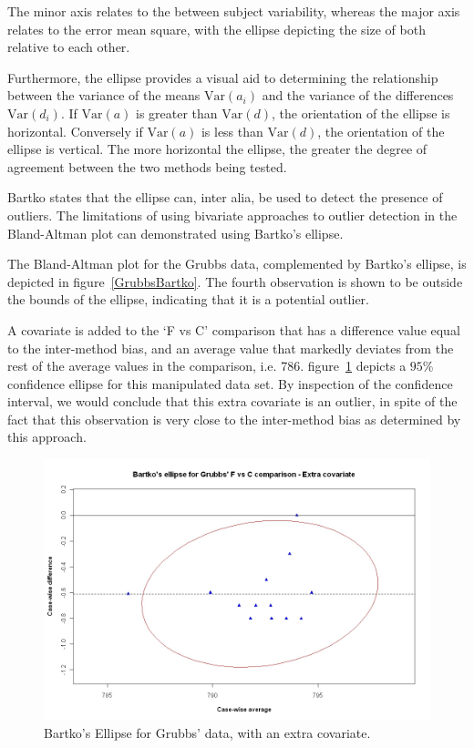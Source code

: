 \documentclass[12pt, a4paper]{report}
\theoremstyle{plain}
\theoremstyle{definition}
\theoremstyle{remark}
\begin{document}
The minor axis relates to the between subject variability, whereas
the major axis relates to the error mean square, with the ellipse
depicting the size of both relative to each other.



Furthermore, the ellipse provides a visual aid to determining the relationship between the variance of the means $\mbox{Var}(a_{i})$ and the variance of the differences $\mbox{Var}(d_{i})$. If $\mbox{Var}(a)$ is greater than $\mbox{Var}(d)$, the orientation of the ellipse is horizontal. Conversely if $\mbox{Var}(a)$ is less than $\mbox{Var}(d)$, the orientation of the ellipse is vertical. The more horizontal the ellipse, the greater the degree of agreement between the two methods being tested.


Bartko states that the ellipse can, inter alia, be used to detect the presence of outliers. The limitations of using bivariate approaches to outlier detection in the Bland-Altman plot can demonstrated using Bartko's ellipse.


The Bland-Altman plot for the Grubbs data, complemented by Bartko's ellipse, is depicted in figure~\ref{GrubbsBartko}.
The fourth observation is shown to be outside the bounds of the ellipse, indicating that it is a potential outlier.

A covariate is added to the `F vs C' comparison that has a
difference value equal to the inter-method bias, and an average
value that markedly deviates from the rest of the average values
in the comparison, i.e. 786. figure~\ref{GrubbsBartko2} depicts a $95\%$ confidence
ellipse for this manipulated data set. By inspection of the
confidence interval, we would conclude that this extra
covariate is an outlier, in spite of the fact that this
observation is very close to the inter-method bias as determined by this approach.

\begin{figure}[h!]
	\includegraphics[width=130mm]{images/GrubbsBartko2.jpeg}
	\caption{Bartko's Ellipse for Grubbs' data, with an extra covariate.}\label{GrubbsBartko2}
\end{figure}
\end{document}
